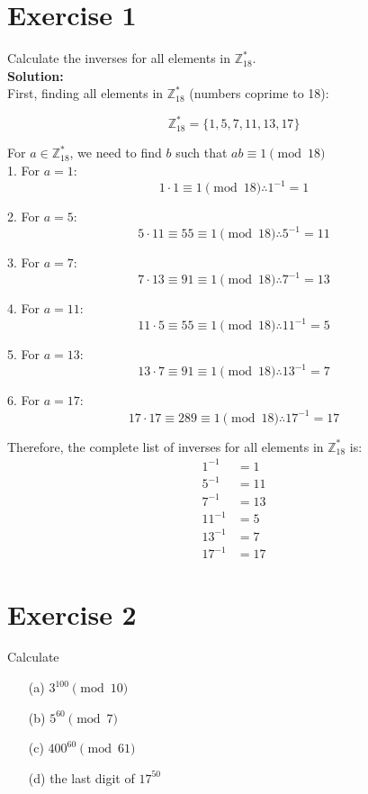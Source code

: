 \documentclass{article}
\begin{document}
\section*{Exercise 1}
Calculate the inverses for all elements in $\mathbb{Z}_{18}^*$. \\

\textbf{Solution:} \\

First, finding all elements in $\mathbb{Z}_{18}^*$ (numbers coprime to 18):

$$\mathbb{Z}_{18}^* = \{1, 5, 7, 11, 13, 17\}$$

For $a \in \mathbb{Z}_{18}^*$, we need to find $b$ such that $ab \equiv 1 \pmod{18}$ \\

1. For $a = 1$:
  $$1 \cdot 1 \equiv 1 \pmod{18} \therefore 1^{-1} = 1$$

2. For $a = 5$:
  $$5 \cdot 11 \equiv 55 \equiv 1 \pmod{18} \therefore 5^{-1} = 11$$

3. For $a = 7$:
  $$7 \cdot 13 \equiv 91 \equiv 1 \pmod{18} \therefore 7^{-1} = 13$$

4. For $a = 11$:
  $$11 \cdot 5 \equiv 55 \equiv 1 \pmod{18} \therefore 11^{-1} = 5$$

5. For $a = 13$:
  $$13 \cdot 7 \equiv 91 \equiv 1 \pmod{18} \therefore 13^{-1} = 7$$

6. For $a = 17$:
  $$17 \cdot 17 \equiv 289 \equiv 1 \pmod{18} \therefore 17^{-1} = 17$$

Therefore, the complete list of inverses for all elements in $\mathbb{Z}_{18}^*$ is:
\begin{align*}
1^{-1} &= 1 \\
5^{-1} &= 11 \\
7^{-1} &= 13 \\
11^{-1} &= 5 \\
13^{-1} &= 7 \\
17^{-1} &= 17
\end{align*}

\newpage

\section*{Exercise 2}
Calculate
\begin{itemize}
\item[(a)] $3^{100} \pmod{10}$
\item[(b)] $5^{60} \pmod{7}$
\item[(c)] $400^{60} \pmod{61}$
\item[(d)] the last digit of $17^{50}$
\end{itemize}
\end{document}
